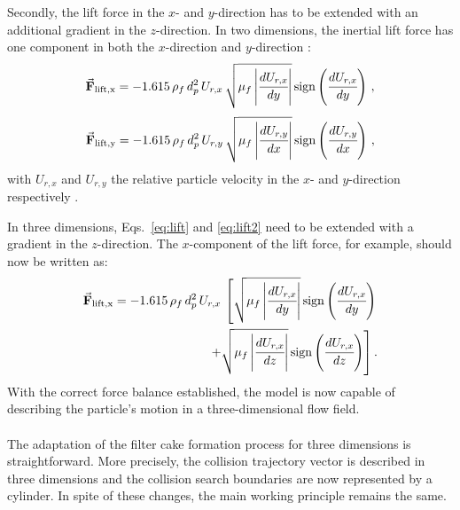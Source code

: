 Secondly, the lift force in the $x$- and $y$-direction has to be extended with an additional gradient in the $z$-direction. In two dimensions, the inertial lift force has one component in both the $x$-direction and $y$-direction \citep{saffman1965}:
\begin{equation}
 \displaystyle \vec{\mathbf{F}}_\mathrm{lift,x} = - 1.615\, \rho_f\, d_p^2\, {U}_{r,x}\, \sqrt{\mu_f \left| \cfrac{d U_{r,x}}{dy} \right|} \, \mathrm{sign}\left(\cfrac{d U_{r,x}}{dy}  \right)\, , 
\label{eq:lift}
 \end{equation}
\begin{equation}
 \displaystyle \vec{\mathbf{F}}_\mathrm{lift,y} = - 1.615\, \rho_f\, d_p^2\, {U}_{r,y}\, \sqrt{\mu_f \left| \cfrac{d U_{r,y}}{dx} \right|} \, \mathrm{sign}\left(\cfrac{d U_{r,y}}{dx}  \right)\, ,
\label{eq:lift2}
 \end{equation}
with $U_{r,x}$ and $U_{r,y}$ the relative particle velocity in the $x$- and $y$-direction respectively . \par
In three dimensions, Eqs.\ \eqref{eq:lift} and \eqref{eq:lift2}
 need to be extended with a gradient in the $z$-direction.  %
 The $x$-component of the lift force, for example, should now be written as:
\begin{equation}
\begin{split}
 \displaystyle \vec{\mathbf{F}}_\mathrm{lift,x} = - 1.615\, \rho_f\, d_p^2\, {U}_{r,x}\, \left[ \sqrt{\mu_f \left| \cfrac{d U_{r,x}}{dy} \right|} \, \mathrm{sign}\left(\cfrac{d U_{r,x}}{dy}  \right) \right.\\ 
 \left. + \sqrt{\mu_f \left| \cfrac{d U_{r,x}}{dz} \right|} \, \mathrm{sign}\left(\cfrac{d U_{r,x}}{dz}  \right) \right].
\end{split}
\label{eq:lift3D}
\end{equation}
With the correct force balance established, the model is now capable of describing the particle's motion in a three-dimensional flow field. \\ \\%
The adaptation of the filter cake formation process for three dimensions is straightforward. More precisely, the collision trajectory vector is described in three dimensions and the collision search boundaries are now represented by a cylinder. In spite of these changes, the main working principle remains the same.
